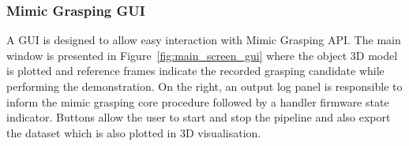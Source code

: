 \begin{figure}[h!]
\end{figure}

\subsubsection{Mimic Grasping \acl{GUI}}
\label{cap4:modular_grasping_architecture:sec:grasping_synthesis:subsec:mimic_grasping:subsubsec:gui}

A \ac{GUI} is designed to allow easy interaction with Mimic Grasping API. The main window is presented in Figure~\ref{fig:main_screen_gui} where the object 3D model is plotted and reference frames indicate the recorded grasping candidate while performing the demonstration. On the right, an output log panel is responsible to inform the mimic grasping core procedure followed by a handler firmware state indicator. Buttons allow the user to start and stop the pipeline and also export the dataset which is also plotted in 3D visualisation. 


